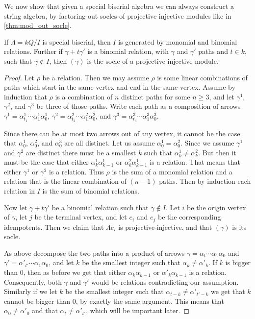 We now show that given a special biserial algebra we can always construct a string algebra, by factoring out socles of projective injective modules like in \cref{thm:mod_out_socle}.

\begin{prop}\label{prop:special_biserail_algerbas_are_binomial}
	If $\Lambda = kQ/I$ is special biserial, then $I$ is generated by monomial and binomial relations. Further if $\gamma + t\gamma'$ is a binomial relation, with $\gamma$ and $\gamma'$ paths and $t \in k$, such that $\gamma \not\in I$, then $(\gamma)$ is the socle of a projective-injective module.
	\begin{proof}
		Let $\rho$ be a relation. Then we may assume $\rho$ is some linear combinations of paths which start in the same vertex and end in the same vertex. Assume by induction that $\rho$ is a combination of $n$ distinct paths for some $n\geq 3$, and let $\gamma^1$, $\gamma^2$, and $\gamma^3$ be three of those paths. Write each path as a composition of arrows $\gamma^1 = \alpha^1_{t_1} \cdots \alpha^1_1\alpha^1_0$,  $\gamma^2 = \alpha^2_{t_2} \cdots \alpha^2_1\alpha^2_0$, and  $\gamma^3 = \alpha^3_{t_3} \cdots \alpha^3_1\alpha^3_0$.
		
		Since there can be at most two arrows out of any vertex, it cannot be the case that $\alpha^1_0$, $\alpha^2_0$, and $\alpha^3_0$ are all distinct. Let us assume $\alpha^1_0 = \alpha^2_0$. Since we assume $\gamma^1$ and $\gamma^2$ are distinct there must be a smallest $k$ such that $\alpha^1_k \neq \alpha^2_k$. But then it must be the case that either $\alpha^1_k\alpha^1_{k-1}$ or $\alpha^2_k\alpha^1_{k-1}$ is a relation. That means that either $\gamma^1$ or $\gamma^2$ is a relation. Thus $\rho$ is the sum of a monomial relation and a relation that is the linear combination of $(n-1)$ paths. Then by induction each relation in $I$ is the sum of binomial relations.
		
		Now let $\gamma + t\gamma'$ be a binomial relation such that $\gamma \not\in I$. Let $i$ be the origin vertex of $\gamma$, let $j$ be the terminal vertex, and let $e_i$ and $e_j$ be the corresponding idempotents. Then we claim that $\Lambda e_i$ is projective-injective, and that $(\gamma)$ is its socle.
		
		As above decompose the two paths into a product of arrows $\gamma = \alpha_{t}\cdots \alpha_1\alpha_0$ and $\gamma' = \alpha'_{t'}\cdots \alpha_1\alpha_0$, and let $k$ be the smallest integer such that $\alpha_k \neq \alpha'_k$. If $k$ is bigger than 0, then as before we get that either $\alpha_k\alpha_{k-1}$ or $\alpha'_k\alpha_{k-1}$ is a relation. Consequently, both $\gamma$ and $\gamma'$ would be relations contradicting our assumption. Similarly if we let $k$ be the smallest integer such that $\alpha_{t-k} \neq \alpha'_{t'-k}$ we get that $k$ cannot be bigger than 0, by exactly the same argument. This means that $\alpha_0 \neq \alpha'_0$ and that $\alpha_t \neq \alpha'_{t'}$, which will be important later.


\end{proof}
\end{prop}
